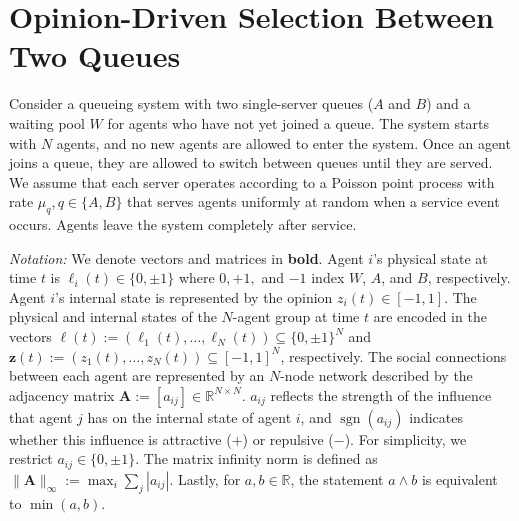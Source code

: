 \documentclass[conference]{IEEEtran}
\DeclareMathOperator{\sgn}{sgn}
\begin{document}
\section{Opinion-Driven Selection Between Two Queues}\label{sec:nod_queues}
Consider a queueing system with two single-server queues ($A$ and $B$) and a waiting pool $W$ for agents who have not yet joined a queue. 
The system starts with $N$ agents, and no new agents are allowed to enter the system.
Once an agent joins a queue, they are allowed to switch between queues until they are served.
We assume that each server operates according to a Poisson point process with rate $\mu_q, q \in \{A, B\}$ that serves agents uniformly at random when a service event occurs.
Agents leave the system completely after service. 

\textit{Notation:} We denote vectors and matrices in \textbf{bold}. Agent $i$'s physical state at time $t$ is $\ell_i(t) \in \{0, \pm1\}$ 
where $0, +1,$ and $-1$ index $W$, $A$, and $B$, respectively.
Agent $i$'s internal state is represented by the opinion $z_i(t) \in [-1,1]$.
The physical and internal states of the $N$-agent group at time $t$ are encoded in the vectors $\boldsymbol{\ell}(t) := (\ell_1(t), \dots, \ell_N(t)) \subseteq \{0, \pm 1\}^N$ and $\boldsymbol{z}(t) := (z_1(t), \dots, z_N(t)) \subseteq [-1, 1]^N$, respectively. The social connections between each agent are represented by an $N$-node network described by the adjacency matrix $\boldsymbol{A} := [a_{ij}] \in \mathbb{R}^{N \times N}$. $a_{ij}$ reflects the strength of the influence that agent $j$ has on the internal state of agent $i$, and $\sgn(a_{ij})$ indicates whether this influence is attractive ($+$) or repulsive ($-$). For simplicity, we restrict $a_{ij} \in \{0, \pm1\}$. 
The matrix infinity norm is defined as $\|\boldsymbol{A}\|_{\infty} := \max_i \sum_{j}|a_{ij}|$.
Lastly, for $a, b \in \mathbb{R}$, the statement $a \wedge b$ is equivalent to $\min(a,b)$.
\end{document}
